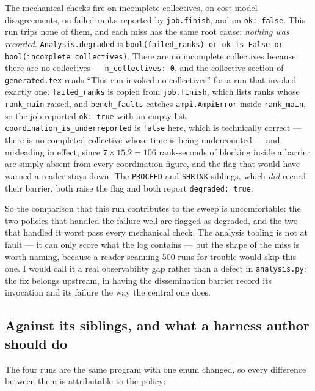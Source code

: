 \documentclass[11pt]{article}
\begin{document}
The mechanical checks fire on incomplete collectives, on cost-model disagreements, on
failed ranks reported by \texttt{job.finish}, and on \texttt{ok: false}. This run trips
none of them, and each miss has the same root cause: \emph{nothing was recorded}.
\texttt{Analysis.degraded} is
\texttt{bool(failed\_ranks) or ok is False or bool(incomplete\_collectives)}. There are no
incomplete collectives because there are no collectives --- \texttt{n\_collectives: 0},
and the collective section of \texttt{generated.tex} reads ``This run invoked no
collectives'' for a run that invoked exactly one. \texttt{failed\_ranks} is copied from
\texttt{job.finish}, which lists ranks whose \texttt{rank\_main} raised, and
\texttt{bench\_faults} catches \texttt{ampi.AmpiError} inside \texttt{rank\_main}, so the
job reported \texttt{ok: true} with an empty list. \texttt{coordination\_is\_underreported}
is \texttt{false} here, which is technically correct --- there is no completed collective
whose time is being undercounted --- and misleading in effect, since $7 \times 15.2 = 106$
rank-seconds of blocking inside a barrier are simply absent from every coordination
figure, and the flag that would have warned a reader stays down. The
\texttt{PROCEED} and \texttt{SHRINK} siblings, which \emph{did} record their barrier, both
raise the flag and both report \texttt{degraded: true}.

So the comparison that this run contributes to the sweep is uncomfortable: the two
policies that handled the failure well are flagged as degraded, and the two that handled
it worst pass every mechanical check. The analysis tooling is not at fault --- it can only
score what the log contains --- but the shape of the miss is worth naming, because a
reader scanning 500 runs for trouble would skip this one. I would call it a real
observability gap rather than a defect in \texttt{analysis.py}: the fix belongs upstream,
in having the dissemination barrier record its invocation and its failure the way the
central one does.

\subsection{Against its siblings, and what a harness author should do}

The four runs are the same program with one enum changed, so every difference between
them is attributable to the policy:
\end{document}
